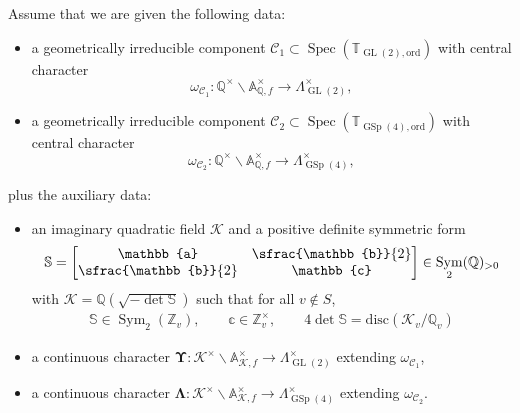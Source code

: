 \documentclass[JEP,XML,SOM,Unicode,published]{cedram}
\theoremstyle{plain}
\theoremstyle{remark}
\let\mr\mathrm
\newcommand{\bA}{\mathbb{A}}
\newcommand{\bQ}{\mathbb{Q}}
\newcommand{\bS}{\mathbb{S}}
\newcommand{\bT}{\mathbb{T}}
\newcommand{\bZ}{\mathbb{Z}}
\newcommand{\bba}{\mathbb{a}}
\newcommand{\bbb}{\mathbb{b}}
\newcommand{\bbc}{\mathbb{c}}
\newcommand{\cK}{\mathcal{K}}
\newcommand{\sC}{\mathscr{C}}
\DeclareMathOperator{\GL}{GL}
\DeclareMathOperator{\GSp}{GSp}
\newcommand{\ord}{\mathrm{ord}}
\DeclareMathOperator{\Spec}{Spec}
\DeclareMathOperator{\Sym}{Sym}
\newcommand{\bLam}{\boldsymbol\Lambda}
\newcommand{\bUps}{\boldsymbol\Upsilon}
\begin{document}
\pagebreak[2]
Assume that we are given the following data:
\begin{itemize}
\item
a geometrically irreducible component $\sC_1\subset \Spec(\bT_{\GL(2),\ord})$ with central character
\[
\omega_{\sC_1}:\bQ^\times\backslash\bA^\times_{\bQ,f}\to \Lambda^\times_{\GL(2)},
\]
\item
a geometrically irreducible component $\sC_2\subset \Spec(\bT_{\GSp(4),\ord})$ with central character
\[
\omega_{\sC_2}:\bQ^\times\backslash\bA^\times_{\bQ,f}\to \Lambda^\times_{\GSp(4)},
\]
\end{itemize}
plus the auxiliary data:
\begin{itemize}
\item
an imaginary quadratic field $\cK$ and a positive definite symmetric form
\[\bS=\begin{bmatrix}\bba&\sfrac{\bbb}{2}\\ \sfrac{\bbb}{2}&\bbc\end{bmatrix}\in\Sym_2(\bQ)_{>0}
\]
with $\cK=\bQ(\sqrt{-\det\bS})$ such that for all $v\notin S$,
\begin{align*}
\bS\in \Sym_2(\bZ_v),
\qquad\bbc\in \bZ^\times_v,
\qquad 4\det\bS=\mr{disc}(\cK_v/\bQ_v)
\end{align*}
\item
a continuous character $\bUps:\cK^\times\backslash\bA^\times_{\cK,f}\to \Lambda^\times_{\GL(2)}$ extending $\omega_{\sC_1}$,
\item
a continuous character $\bLam:\cK^\times\backslash\bA^\times_{\cK,f}\to \Lambda^\times_{\GSp(4)}$ extending $\omega_{\sC_2}$.
\end{itemize}
\end{document}
